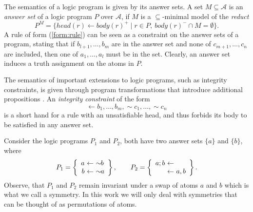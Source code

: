 \documentclass[envcountsame]{llncs}
\newcommand{\alphabet}{\mathcal{A}}
\newcommand{\head}[1]{head(#1)}
\newcommand{\body}[1]{body(#1)}
\newcommand{\dneg}[0]{\sim\!\!}
\begin{document}
The semantics of a logic program is given by its answer sets. A set $M \subseteq \alphabet$ is an \emph{answer set} of a logic program $P$ over $\alphabet$, if $M$ is a $\subseteq$-minimal model of the \emph{reduct} \cite{gellif91a}
\[
P^M = \{ \head{r} \leftarrow \body{r}^{+} \mid r \in P,\ \body{r}^{-} \cap M = \emptyset\}.
\]
A rule of form (\ref{form:rule}) can be seen as a constraint on the answer sets of a program, stating that if $b_{l+1} , \dots , b_m$ are in the answer set and none of $c_{m+1} , \dots , c_n$ are included, then one of $a_1, \dots, a_l$ must be in the set. Clearly, an answer set induces a truth assignment on the atoms in $P$.

The semantics of important extensions to logic programs, such as integrity constraints, is given through program transformations that introduce additional propositions \cite{siniso02a}.
An \emph{integrity constraint} of the form
\begin{equation} \label{form:integrity}
\leftarrow b_1 , \dots , b_m, \dneg c_1 , \dots , \dneg c_n
\end{equation}
is a short hand for a rule with an unsatisfiable head, and thus forbids its body to be satisfied in any answer set.

\begin{example} Consider the logic programs $P_1$ and $P_2$, both have two answer sets $\{a\}$ and $\{b\}$, where
\[
P_1 = \left\{
\begin{array}{r@{\ \leftarrow\ }l}
a & \dneg b\\
b & \dneg a\\
\end{array}\right\},
\qquad
P_2 = \left\{
\begin{array}{r@{\ \leftarrow\ }l}
a ; b & \\
& a, b\\
\end{array}\right\}.
\]
Observe, that $P_1$ and $P_2$ remain invariant under a swap of atoms $a$ and $b$ which is what we call a symmetry. In this work we will only deal with symmetries that can be thought of as permutations of atoms.
\end{example}
\end{document}
